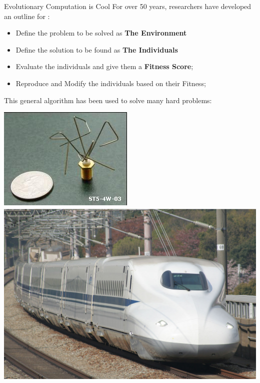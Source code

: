 \documentclass[aspectratio=169]{beamer}
\begin{document}
\begin{frame}[t]{Evolutionary Computation is Cool}
  For over 50 years, researchers have developed an outline for  :\bigskip

  \begin{itemize}
    \item Define the problem to be solved as {\bf The Environment}
    \item Define the solution to be found as {\bf The Individuals}
    \item Evaluate the individuals and give them a {\bf Fitness Score};
    \item Reproduce and Modify the individuals based on their Fitness;
  \end{itemize}
\medskip

This general algorithm has been used to solve many hard problems:

\hspace{0.2\textwidth}
\includegraphics[height=0.4\textheight]{img/GA_Sattelite.png}
\includegraphics[height=0.4\textheight]{img/GA_N500.png}

\end{frame}
\end{document}
